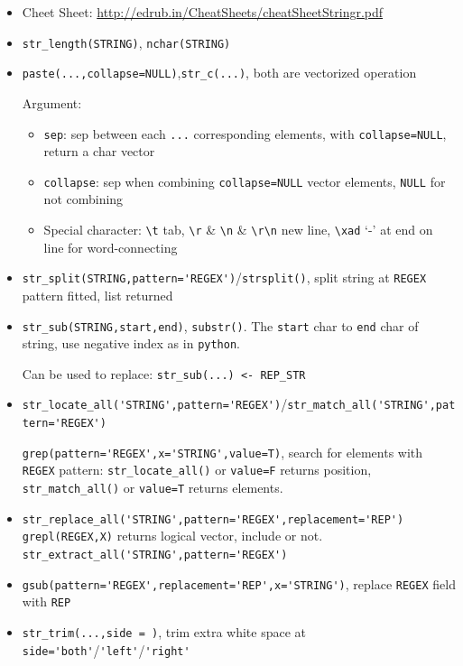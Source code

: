 \begin{itemize}[topsep=2pt,itemsep=0pt]
    \item Cheet Sheet: \url{http://edrub.in/CheatSheets/cheatSheetStringr.pdf}
    \item \lstinline|str_length(STRING)|, \lstinline|nchar(STRING)|
    \item \lstinline|paste(...,collapse=NULL)|,\lstinline|str_c(...)|, both are vectorized operation
    
    Argument:
    \begin{itemize}[topsep=2pt,itemsep=0pt]
        \item \lstinline|sep|: sep between each \lstinline|...| corresponding elements, with \lstinline|collapse=NULL|, return a char vector
        \item \lstinline|collapse|: sep when combining \lstinline|collapse=NULL| vector elements, \lstinline|NULL| for not combining
        \item Special character: \lstinline|\t| tab, \lstinline|\r| \& \lstinline|\n| \& \lstinline|\r\n| new line, \lstinline|\xad| `-' at end on line for word-connecting
    \end{itemize}
    
    \item \lstinline|str_split(STRING,pattern='REGEX')|/\lstinline|strsplit()|, split string at \lstinline|REGEX| pattern fitted, list returned
    \item \lstinline|str_sub(STRING,start,end)|, \lstinline|substr()|. The \lstinline|start| char to \lstinline|end| char of string, use negative index as in \lstinline|python|.
     
    Can be used to replace: \lstinline|str_sub(...) <- REP_STR|
    \item \lstinline|str_locate_all('STRING',pattern='REGEX')|/\lstinline|str_match_all('STRING',pattern='REGEX')|

    \lstinline|grep(pattern='REGEX',x='STRING',value=T)|, search for elements with \lstinline|REGEX| pattern: \lstinline|str_locate_all()| or \lstinline|value=F|  returns position, \lstinline|str_match_all()| or \lstinline|value=T| returns elements.
    
    \item \lstinline|str_replace_all('STRING',pattern='REGEX',replacement='REP')|
    \lstinline|grepl(REGEX,X)| returns logical vector, include or not.
    \lstinline|str_extract_all('STRING',pattern='REGEX')|
    \item \lstinline|gsub(pattern='REGEX',replacement='REP',x='STRING')|, replace \lstinline|REGEX| field with \lstinline|REP|
    \item \lstinline|str_trim(...,side = )|, trim extra white space at \lstinline|side='both'|/\lstinline|'left'|/\lstinline|'right'|
\end{itemize}




